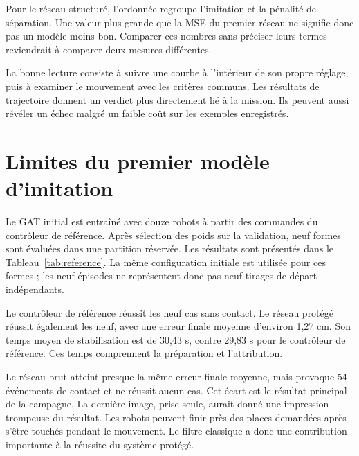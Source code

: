 Pour le réseau structuré, l'ordonnée regroupe l'imitation et la pénalité de séparation. Une valeur plus grande que la MSE du premier réseau ne signifie donc pas un modèle moins bon. Comparer ces nombres sans préciser leurs termes reviendrait à comparer deux mesures différentes.

La bonne lecture consiste à suivre une courbe à l'intérieur de son propre réglage, puis à examiner le mouvement avec les critères communs. Les résultats de trajectoire donnent un verdict plus directement lié à la mission. Ils peuvent aussi révéler un échec malgré un faible coût sur les exemples enregistrés.

\section{Limites du premier modèle d'imitation}
Le GAT initial est entraîné avec douze robots à partir des commandes du contrôleur de référence. Après sélection des poids sur la validation, neuf formes sont évaluées dans une partition réservée. Les résultats sont présentés dans le Tableau~\ref{tab:reference}. La même configuration initiale est utilisée pour ces formes ; les neuf épisodes ne représentent donc pas neuf tirages de départ indépendants.

\begin{table}[htbp]
\caption[Comparaison réservée du GAT initial]{Campagne réservée du modèle initial. Les erreurs et temps sont des moyennes ; le temps porte sur les épisodes réussis. Le tiret indique qu'aucun épisode n'a réussi. Données issues du rapport 008d.}
\label{tab:reference}
\centering\small



\end{table}

Le contrôleur de référence réussit les neuf cas sans contact. Le réseau protégé réussit également les neuf, avec une erreur finale moyenne d'environ 1,27 cm. Son temps moyen de stabilisation est de 30,43 s, contre 29,83 s pour le contrôleur de référence. Ces temps comprennent la préparation et l'attribution.

Le réseau brut atteint presque la même erreur finale moyenne, mais provoque 54 événements de contact et ne réussit aucun cas. Cet écart est le résultat principal de la campagne. La dernière image, prise seule, aurait donné une impression trompeuse du résultat. Les robots peuvent finir près des places demandées après s'être touchés pendant le mouvement. Le filtre classique a donc une contribution importante à la réussite du système protégé.

